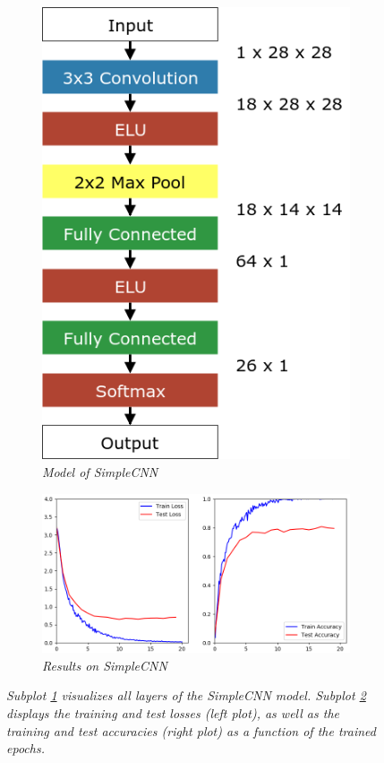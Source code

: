 \documentclass[a4paper]{article}
\begin{document}
\begin{figure}
    \centering
    \begin{subfigure}[b]{0.2\textwidth}
        \includegraphics[height=0.25\paperwidth]{graphics/nets/SimpleCNN}
        \caption{\textit{Model of SimpleCNN}}
        \label{fig:simpleCNN_model}
    \end{subfigure}
    \qquad
    \qquad
    \begin{subfigure}[b]{0.6\textwidth}
        \includegraphics[height=0.25\paperwidth]{graphics/nets/SimpleCNN_Results}
        \caption{\textit{Results on SimpleCNN}}
        \label{fig:simpleCNN_results}
    \end{subfigure}
    \caption{\textit{Subplot \ref{fig:simpleCNN_model} visualizes all layers of the SimpleCNN model. Subplot \ref{fig:simpleCNN_results} displays the training and test losses (left plot), as well as the training and test accuracies (right plot) as a function of the trained epochs.}}\label{fig:simpleCNN}
\end{figure}
\end{document}
